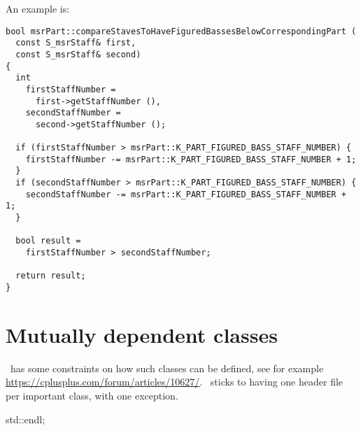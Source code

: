 An example is:
\begin{lstlisting}[language=Terminal]
bool msrPart::compareStavesToHaveFiguredBassesBelowCorrespondingPart (
  const S_msrStaff& first,
  const S_msrStaff& second)
{
  int
    firstStaffNumber =
      first->getStaffNumber (),
    secondStaffNumber =
      second->getStaffNumber ();

  if (firstStaffNumber > msrPart::K_PART_FIGURED_BASS_STAFF_NUMBER) {
    firstStaffNumber -= msrPart::K_PART_FIGURED_BASS_STAFF_NUMBER + 1;
  }
  if (secondStaffNumber > msrPart::K_PART_FIGURED_BASS_STAFF_NUMBER) {
    secondStaffNumber -= msrPart::K_PART_FIGURED_BASS_STAFF_NUMBER + 1;
  }

  bool result =
    firstStaffNumber > secondStaffNumber;

  return result;
}
\end{lstlisting}


\section{Mutually dependent classes}

\CPlusplus\ has some constraints on how such classes can be defined, see for example \url{https://cplusplus.com/forum/articles/10627/}. \mf\ sticks to having one header file per important class, with one exception.


      std::endl;

%
%


